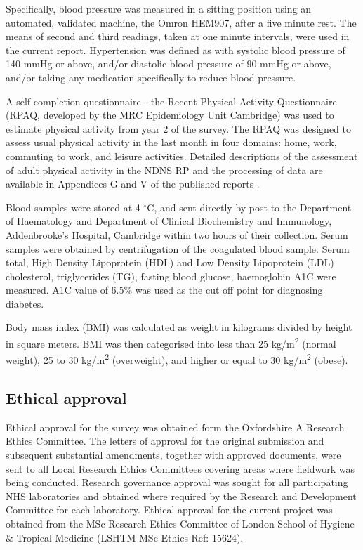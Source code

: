 Specifically, blood pressure was measured in a sitting position using an automated, validated machine, the Omron HEM907, after a five minute rest. The means of second and third readings, taken at one minute intervals, were used in the current report. Hypertension was defined as with systolic blood pressure of 140 mmHg or above, and/or diastolic blood pressure of 90 mmHg or above, and/or taking any medication specifically to reduce blood pressure. 

A self-completion questionnaire - the Recent Physical Activity Questionnaire  \parencite{besson2009estimating} (RPAQ, developed by the MRC Epidemiology Unit Cambridge) was used to estimate physical activity from year 2 of the survey. The RPAQ was designed to assess usual physical activity in the last month in four domains: home, work, commuting to work, and leisure activities. Detailed descriptions of the assessment of adult physical activity in the NDNS RP and the processing of data are available in Appendices G and V of the published reports \parencite{bates2014national,roberts2018national,NDNSofficial}. 

Blood samples were stored at 4 $^\circ$C, and sent directly by post to the Department of Haematology and Department of Clinical Biochemistry and Immunology, Addenbrooke's Hospital, Cambridge within two hours of their collection. Serum samples were obtained by centrifugation of the coagulated blood sample. Serum total, High Density Lipoprotein (HDL) and Low Density Lipoprotein (LDL) cholesterol, triglycerides (TG), fasting blood glucose, haemoglobin A1C were measured. A1C value of 6.5\% was used as the cut off point for diagnosing diabetes.

Body mass index (BMI) was calculated as weight in kilograms divided by height in square meters. BMI was then categorised into less than 25 kg/m\textsuperscript{2} (normal weight), 25 to 30 kg/m\textsuperscript{2} (overweight), and higher or equal to 30 kg/m\textsuperscript{2} (obese). 

\subsection{Ethical approval}\vspace{-0.3cm}

Ethical approval for the survey was obtained form the Oxfordshire A Research Ethics Committee. The letters of approval for the original submission and subsequent substantial amendments, together with approved documents, were sent to all Local Research Ethics Committees covering areas where fieldwork was being conducted. Research governance approval was sought for all participating NHS laboratories and obtained where required by the Research and Development Committee for each laboratory. Ethical approval for the current project was obtained from the MSc Research Ethics Committee of London School of Hygiene \& Tropical Medicine (LSHTM MSc Ethics Ref: 15624). 


